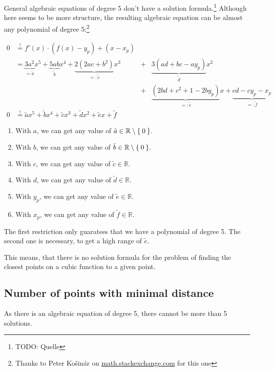 \documentclass[a4paper]{scrartcl}
\theoremstyle{break}
\def\mdr{\ensuremath{\mathbb{R}}}
\theoremstyle{nonumberplain}
\def\mdr{\ensuremath{\mathbb{R}}}
\begin{document}
General algebraic equations of degree 5 don't have a solution formula.\footnote{TODO: Quelle}
Although here seems to be more structure, the resulting algebraic
equation can be almost any polynomial of degree 5:\footnote{Thanks to Peter Košinár on \href{http://math.stackexchange.com/a/584814/6876}{math.stackexchange.com} for this one}

\begin{align}
    0  &\stackrel{!}{=} f'(x) \cdot \left (f(x) - y_p \right ) + (x - x_p)\\
    &= \underbrace{3 a^2}_{= \tilde{a}} x^5 + \underbrace{5ab}_{\tilde{b}}x^4 + \underbrace{2(2ac + b^2 )}_{=: \tilde{c}}x^3 &+& \underbrace{3(ad+bc-ay_p)}_{\tilde{d}} x^2 \\
    & &+& \underbrace{(2 b d+c^2+1-2 b y_p)}_{=: \tilde{e}}x+\underbrace{c d-c y_p-x_p}_{=: \tilde{f}}\\
    0 &\stackrel{!}{=} \tilde{a}x^5 + \tilde{b}x^4 + \tilde{c}x^3 + \tilde{d}x^2 + \tilde{e}x + \tilde{f}
\end{align}

\begin{enumerate}
    \item With $a$, we can get any value of $\tilde{a} \in \mdr \setminus \Set{0}$.
    \item With $b$, we can get any value of $\tilde{b} \in \mdr \setminus \Set{0}$.
    \item With $c$, we can get any value of $\tilde{c} \in \mdr$.
    \item With $d$, we can get any value of $\tilde{d} \in \mdr$.
    \item With $y_p$, we can get any value of $\tilde{e} \in \mdr$.
    \item With $x_p$, we can get any value of $\tilde{f} \in \mdr$.
\end{enumerate}

The first restriction only guaratees that we have a polynomial of 
degree 5. The second one is necessary, to get a high range of
$\tilde{e}$.

This means, that there is no solution formula for the problem of 
finding the closest points on a cubic function to a given point.

\subsection{Number of points with minimal distance}
As there is an algebraic equation of degree 5, there cannot be more
than 5 solutions.

\end{document}
